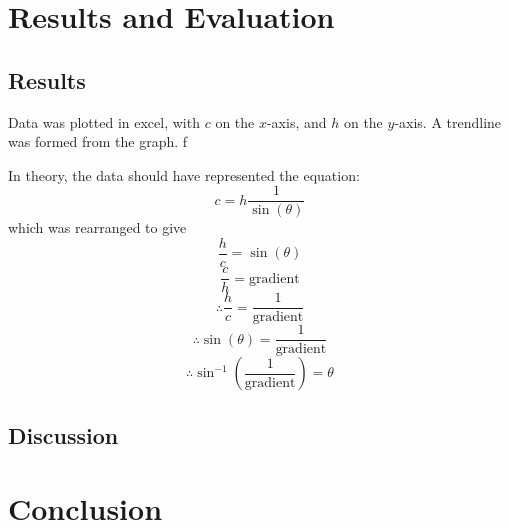 \documentclass[12pt,a4paper]{article}
\begin{document}
\section{Results and Evaluation}
\subsection{Results}


Data was plotted in excel, with $c$ on the $x$-axis, and  $h$ on the $y$-axis. A trendline was formed from the graph. f

In theory, the data should have represented the equation:
$$c=h\frac{1}{\sin(\theta)}$$
which was rearranged to give 
$$\frac{h}{c}=\sin{(\theta)}$$
$$\frac{c}{h}=\mathrm{gradient}$$
$$\therefore \frac{h}{c}=\frac{1}{\mathrm{gradient}}$$
$$\therefore \sin(\theta)=\frac{1}{\textrm{gradient}}$$
$$\therefore \sin^{-1}\left(\frac{1}{
\textrm{gradient}}\right)=\theta$$
\subsection{Discussion}


\section{Conclusion}

	
	
	
\end{document}
